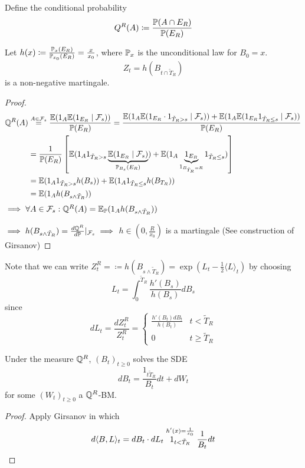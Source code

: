 Define the conditional probability 
\[Q^R(A)\coloneqq \frac{\mathbb{P}(A\cap E_R)}{\mathbb{P}(E_R)}\]

\begin{lemma}\label{lem:2.8}
    Let $h(x)\coloneqq \frac{\mathbb{P}_x(E_R)}{\mathbb{P}_{x_0}(E_R)}=\frac{x}{x_0}$,
    where $\mathbb{P}_x$ is the unconditional law for $B_0=x$.    
    \[Z_t=h(B_{t\cap \tilde{T}_R})\]
    is a non-negative martingale.
\end{lemma}

\begin{proof}
    \begin{align*}
        \mathbb{Q}^R(A)&\stackrel{A\in\mathcal{F}_s}{=}\frac{\mathbb{E}(1_A\mathbb{E}(1_{E_R}\mid \mathcal{F}_s))}{\mathbb{P}(E_R)}=\frac{\mathbb{E}(1_A\mathbb{E}(1_{E_R}\cdot 1_{\tilde{T}_R>s}\mid \mathcal{F}_s))+\mathbb{E}(1_A\mathbb{E}(1_{E_R}1_{\tilde{T}_R\leq s}\mid\mathcal{F}_s))}{\mathbb{P}(E_R)}\\
        &=\frac{1}{\mathbb{P}(E_R)}\left[\mathbb{E}(1_A1_{\tilde{T}_R>s}\underbrace{\mathbb{E}(1_{E_R}\mid\mathcal{F}_s)}_{\mathbb{P}_{B_s}(E_R)})+\mathbb{E}(1_A\underbrace{1_{E_R}}_{1_{B_{\tilde{T}_R}=R}}1_{\tilde{T}_R\leq s}) \right]\\
        &=\mathbb{E}(1_A1_{\tilde{T}_R>s}h(B_s))+\mathbb{E}(1_A1_{\tilde{T}_R\leq s}h(B_{T_R}))\\
        &=\mathbb{E}(1_A h(B_{s\land \tilde{T}_R}))
    \end{align*}
    $\implies\forall A\in\mathcal{F}_s: \mathbb{Q}^R(A)=\mathbb{E}_{\mathbb{P}}(1_Ah(B_{s\land \tilde{T}_R}))$

    $\implies h(B_{s\land \tilde{T}_R})=\frac{d\mathbb{Q}^R}{d\mathbb{P}}\vert_{\mathcal{F}_s} \implies$ $h\in(0,\frac{R}{x_0})$ is a martingale (See construction of Girsanov)  
\end{proof}


Note that we can write $Z_t^R=\coloneqq h(B_{s\land \tilde{T}_R})=\exp(L_t-\frac{1}{2}\langle L\rangle_t)$ by choosing 
\[L_t=\int_0^{\tilde{T}_R}\frac{h'(B_s)}{h(B_s)}dB_s\]
since 
\[dL_t=\frac{dZ_t^R}{Z_t^R}=\begin{cases}
    \frac{h'(B_t)dB_t}{h(B_t)} & t<\tilde{T}_R\\
    0 & t\geq \tilde{T}_R
\end{cases}\]

\begin{proposition}
    Under the measure $\mathbb{Q}^R$, $(B_t)_{t\geq 0}$ solves the SDE 
    \[dB_t=\frac{1_{t\tilde{T}_R}}{B_t}dt+dW_t\]
    for some $(W_t)_{t\geq 0}$ a $\mathbb{Q}^R$-BM.
\end{proposition}

\begin{proof}
    Apply Girsanov in which 
    \[d\langle B,L\rangle_t=dB_t\cdot dL_t \stackrel{h'(x)=\frac{1}{x_0}}{1_{t<\tilde{T}_R}}\frac{1}{B_t}dt\qedhere\]
\end{proof}

